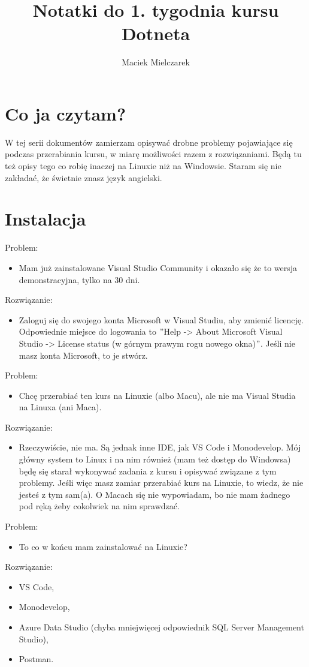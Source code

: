 \documentclass[10pt]{article}
\title{Notatki do 1. tygodnia kursu Dotneta}
\author{Maciek Mielczarek}
\begin{document}
\maketitle


\section{Co ja czytam?}

W tej serii dokumentów zamierzam opisywać drobne problemy pojawiające się podczas przerabiania kursu, w miarę możliwości razem z rozwiązaniami. Będą tu też opisy tego co robię inaczej na Linuxie niż na Windowsie. Staram się nie zakładać, że świetnie znasz język angielski.


\section{Instalacja}

Problem:
\begin{itemize}
\item Mam już zainstalowane Visual Studio Community i okazało się że to wersja demonstracyjna, tylko na 30 dni.
\end{itemize}
Rozwiązanie:
\begin{itemize}
\item Zaloguj się do swojego konta Microsoft w Visual Studiu, aby zmienić licencję. Odpowiednie miejsce do logowania to $"$Help -> About Microsoft Visual Studio -> License status (w górnym prawym rogu nowego okna)$"$. Jeśli nie masz konta Microsoft, to je stwórz.
\end{itemize}


Problem:
\begin{itemize}
\item Chcę przerabiać ten kurs na Linuxie (albo Macu), ale nie ma Visual Studia na Linuxa (ani Maca).
\end{itemize}
Rozwiązanie:
\begin{itemize}
\item Rzeczywiście, nie ma. Są jednak inne IDE, jak VS Code i Monodevelop. Mój główny system to Linux i na nim również (mam też dostęp do Windowsa) będę się starał wykonywać zadania z kursu i opisywać związane z tym problemy. Jeśli więc masz zamiar przerabiać kurs na Linuxie, to wiedz, że nie jesteś z tym sam(a). O Macach się nie wypowiadam, bo nie mam żadnego pod ręką żeby cokolwiek na nim sprawdzać.
\end{itemize}

Problem:
\begin{itemize}
\item To co w końcu mam zainstalować na Linuxie?
\end{itemize}
Rozwiązanie:
\begin{itemize}
\item VS Code,
\item Monodevelop,
\item Azure Data Studio (chyba mniejwięcej odpowiednik SQL Server Management Studio),
\item Postman.
\end{itemize}
\end{document}

